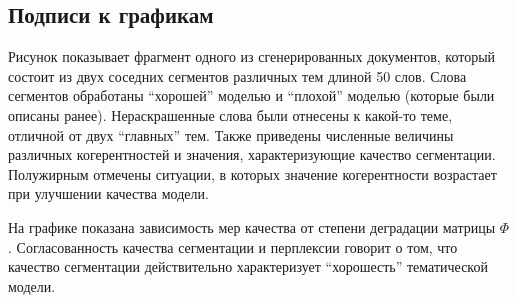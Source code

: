 \subsection{Подписи к графикам}
Рисунок показывает фрагмент одного из сгенерированных документов, который состоит из двух соседних сегментов различных тем длиной 50 слов. Слова сегментов обработаны ``хорошей'' моделью и ``плохой'' моделью (которые были описаны ранее). Нераскрашенные слова были отнесены к какой-то теме, отличной от двух ``главных'' тем. Также приведены численные величины различных когерентностей и значения, характеризующие качество сегментации. Полужирным отмечены ситуации, в которых значение когерентности возрастает при улучшении качества модели.


На графике показана зависимость мер качества от степени деградации матрицы $\Phi$. Согласованность качества сегментации и перплексии говорит о том, что качество сегментации действительно характеризует ``хорошесть'' тематической модели.